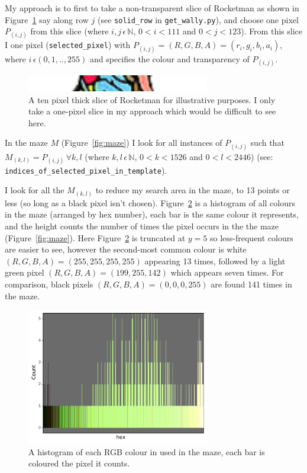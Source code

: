 \documentclass[prb,11pt,twocolumn]{revtex4-1}
\begin{document}
My approach is to first to take a non-transparent slice of Rocketman as shown in Figure~\ref{fig:rocketman_slice} say along row $j$ (see \texttt{solid\_row} in \texttt{get\_wally.py}), and choose one pixel $P_{(i,j)}$ from this slice (where $i,j\,\epsilon\,\mathbb{N}$, $0<i<111$ and $0<j<123$). From this slice I one pixel (\texttt{selected\_pixel}) with $P_{(i,j)}=(R,G,B,A)=(r_i,g_i,b_i,a_i)$, where $i\,\epsilon{(0,1,..,255)}$ and specifies the colour and transparency of $P_{(i,j)}$. 

\begin{figure}
     \includegraphics[width=8cm]{rocketman_slice.pdf}
     \caption{A ten pixel thick slice of Rocketman for illustrative purposes. I only take a one-pixel slice in my approach which would be difficult to see here.}
     \label{fig:rocketman_slice}
\end{figure}

In the maze $M$ (Figure~\ref{fig:maze}) I look for all instances of $P_{(i,j)}$ such that $M_{(k,l)}=P_{(i,j)}\,\forall{k,l}$ (where $k,l\,\epsilon\,\mathbb{N}$, $0<k<1526$ and $0<l<2446$) (see: \texttt{indices\_of\_selected\_pixel\_in\_template}). 

I look for all the $M_{(k,l)}$ to reduce my search area in the maze, to 13 points or less (so long as a black pixel isn't chosen). Figure~\ref{fig:maze-hist} is a histogram of all colours in the maze (arranged by hex number), each bar is the same colour it represents, and the height counts the number of times the pixel occurs in the the maze (Figure~\ref{fig:maze}). Here Figure~\ref{fig:maze-hist} is truncated at $y=5$ so less-frequent colours are easier to see, however the second-most common colour is white $(R,G,B,A)=(255,255,255,255)$ appearing 13 times, followed by a light green pixel $(R,G,B,A)=(199,255,142)$ which appears seven times. For comparison, black pixels $(R,G,B,A)=(0,0,0,255)$ are found 141 times in the maze.

\begin{figure}
     \includegraphics[width=8cm]{maze-colour-hist.pdf}
     \caption{A histogram of each RGB colour in used in the maze, each bar is coloured the pixel it counts.}
     \label{fig:maze-hist}
\end{figure}
\end{document}
